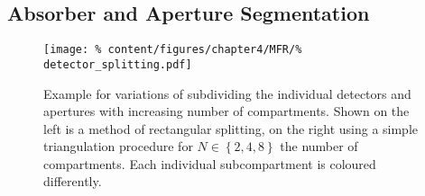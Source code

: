         \subsection{Absorber and Aperture Segmentation}%
%
            \begin{figure}[t]%
                \centering%
                \texttt{[image: \%
                    content/figures/chapter4/MFR/\%
                    detector\_splitting.pdf]}%
                \caption{Example for variations of subdividing the individual detectors and apertures with increasing number of compartments. Shown on the left is a method of rectangular splitting, on the right using a simple triangulation procedure for $N\in\left\{2,4,8\right\}$ the number of compartments. Each individual subcompartment is coloured differently.}\label{fig:detector_splitting}%
            \end{figure}%
%
